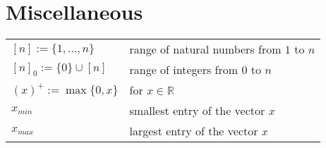 \section*{Miscellaneous}

\begin{tabularx}{\textwidth}{lX}
    $[n] := \{1, \dots, n\}$ & range of natural numbers from $1$ to $n$ \\
    $[n]_0 := \{0\} \cup [n]$ & range of integers from $0$ to $n$ \\
    $(x)^+ := \max\{0, x\}$ & for $x \in \mathbb{R}$ \\
    $x_{min}$ & smallest entry of the vector $x$ \\
    $x_{max}$ & largest entry of the vector $x$ \\
\end{tabularx}
